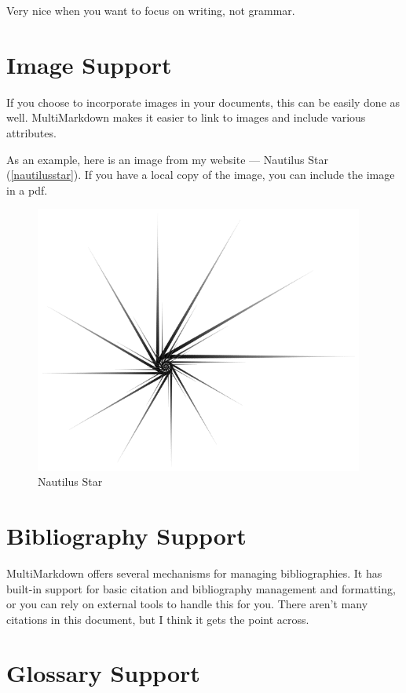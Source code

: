Very nice when you want to focus on writing, not grammar.

\section{Image Support}
\label{imagesupport}

If you choose to incorporate images in your documents, this can be easily done
as well. MultiMarkdown makes it easier to link to images and include various
attributes.

As an example, here is an image from my website --- Nautilus
Star (\autoref{nautilusstar}). If you have a local copy of the image, you can include
the image in a pdf.

\begin{figure}[htbp]
\centering
\includegraphics[width=307pt,height=250pt]{Nautilus_Star.png}
\caption{Nautilus Star}
\label{nautilusstar}
\end{figure}


\section{Bibliography Support}
\label{bibliographysupport}

MultiMarkdown offers several mechanisms for managing bibliographies. It has
built-in support for basic citation and bibliography management and
formatting, or you can rely on external tools to handle this for you. There
aren't many citations in this document, but I think it gets the point
across.~\cite[p. 42]{fake}

\section{Glossary Support}
\label{glossarysupport}

